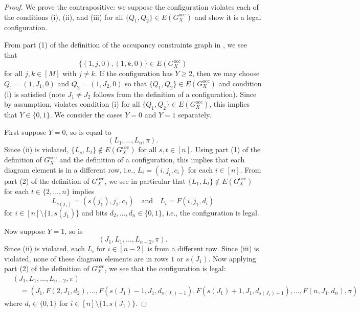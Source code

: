 \documentclass[../thesis-main/thesis-main]{subfiles}
\begin{document}
\begin{proof}
We prove the contrapositive: we suppose the configuration  violates each of the conditions (i), (ii), and (iii) for all $\{Q_{1},Q_{2}\}\in E(G_X^{\text{occ}})$ and show it is a legal configuration.

From part (1) of the definition of the occupancy constraints graph in , we see that
\begin{equation}
  \{(1,j,0),(1,k,0)\}\in E(G_X^{\text{occ}})
\end{equation}
for all $j,k\in[M]$ with $j\neq k$. If the configuration  has $Y\geq 2$, then we may choose $Q_1=(1,J_1,0)$ and $Q_2=(1,J_2,0)$ so that $\{Q_1,Q_2\}\in E(G_X^{\text{occ}})$ and condition (i) is satisfied (note $J_1\neq J_2$ follows from the definition of a configuration). Since by assumption,  violates condition (i) for all $\{Q_{1},Q_{2}\}\in E(G_X^{\text{occ}})$, this implies that $Y\in \{0,1\}$. We consider the cases $Y=0$ and $Y=1$ separately.

First suppose $Y=0$, so  is equal to
\begin{equation}
(L_{1},\ldots,L_{n},\pi).
\end{equation}
Since (ii) is violated, $\{L_s,L_t\}\notin E(G_X^{\text{occ}})$ for all $s,t\in [n]$. Using part (1) of the definition of $G_X^{\text{occ}}$ and the definition of a configuration, this implies that each diagram element is in a different row, i.e., $L_{i}=(i,j_{i},c_{i})$ for each $i\in[n]$. From part (2) of the definition of $G_X^{\text{occ}}$, we see in particular that $\{L_{1},L_{t}\}\notin E(G_X^{\text{occ}})$
for each $t\in\{2,\ldots,n\}$ implies
\begin{equation}
L_{s(j_{1})}=(s(j_{1}),j_{1},c_{1})\quad\text{and}\quad L_{i}=F(i,j_{1},d_{i})
\end{equation}
for $i\in[n]\setminus\{1,s(j_{1})\}$ and bits $d_2,\ldots,d_n\in\{0,1\}$, i.e., the configuration is legal.

Now suppose $Y=1$, so  is
\begin{equation}
  (J_1,L_{1},\ldots,L_{n-2},\pi).
\end{equation}
Since (ii) is violated, each $L_{i}$ for $i\in[n-2]$ is from a different row. Since (iii) is violated, none of these diagram elements are in rows $1$ or $s(J_1)$. Now applying part (2) of the definition of $G_X^{\text{occ}}$, we see that the configuration is legal:
\begin{align}
&(J_1,L_{1},\ldots,L_{n-2},\pi) \\
&\quad=(J_1,F(2,J_1,d_{2}),\ldots,F(s(J_1)-1,J_1,d_{s(J_1)-1}),F(s(J_1)+1,J_1,d_{s(J_1)+1}),\ldots,F(n,J_1,d_{n}),\pi)
\end{align}
where $d_{i}\in\{0,1\}$ for $i\in[n]\setminus\{1,s(J_1)\}$.
\end{proof}
\end{document}
